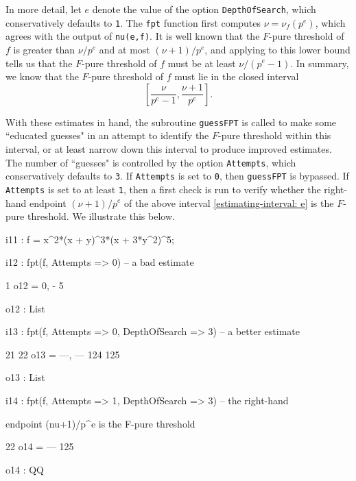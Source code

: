 \documentclass{amsart}
\begin{document}
In more detail, let $e$ denote the value of the option {\tt DepthOfSearch}, which conservatively defaults to {\tt 1}.  The {\tt fpt} function first computes $\nu=\nu_f(p^e)$, which agrees with the output of {\tt nu(e,f)}.  It is well known that the $F$-pure threshold of $f$ is greater than $\nu/p^e$ and at most $(\nu+1)/p^e$, and applying  \cite[Proposition 4.2]{HernandezFPurityOfHypersurfaces} to this lower bound tells us that the $F$-pure threshold of $f$ must be at least $\nu/(p^e-1)$.  In summary, we know that the $F$-pure threshold of $f$ must lie in the closed interval
%
\begin{equation}
\label{estimating-interval: e}
\tag{$\dagger$}
\left[ \frac{\nu}{p^e-1}, \frac{\nu+1}{p^e} \right].
\end{equation}

With these estimates in hand, the subroutine {\tt guessFPT} is called to make some ``educated guesses" in an attempt to identify the $F$-pure threshold within this interval, or at least narrow down this interval to produce improved estimates.  The number of ``guesses" is controlled by the option {\tt Attempts}, which conservatively defaults to {\tt 3}.  If {\tt Attempts} is set to {\tt 0}, then {\tt guessFPT} is bypassed. If  {\tt Attempts} is set to at least {\tt 1}, then a first check is run to verify whether the right-hand endpoint $(\nu+1)/p^e$ of the above interval \eqref{estimating-interval: e} is the $F$-pure threshold.  We illustrate this below.

{\small
{}
\begin{MyVerbatim}

i11 : f = x^2*(x + y)^3*(x + 3*y^2)^5;

i12 : fpt(f, Attempts => 0) -- a bad estimate

          1
o12 = {0, -}
          5

o12 : List

i13 : fpt(f, Attempts => 0, DepthOfSearch => 3) -- a better estimate

        21   22
o13 = {---, ---}
       124  125

o13 : List

i14 : fpt(f, Attempts => 1, DepthOfSearch => 3) -- the right-hand

      endpoint (nu+1)/p^e is the F-pure threshold

       22
o14 = ---
      125

o14 : QQ

\end{MyVerbatim}
}
\end{document}
